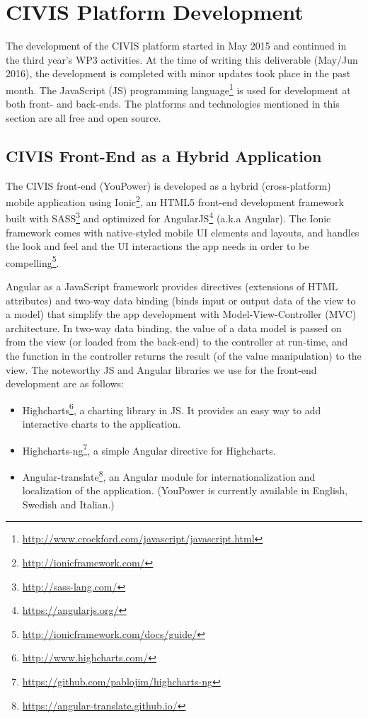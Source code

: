 \section{CIVIS Platform  Development} 
 
The development of the CIVIS platform started in May 2015 \citep{Huang2015c} and continued in the third year's WP3 activities. At the time of writing this deliverable (May/Jun 2016), the development is completed with minor updates took place in the past month.
% 
The JavaScript (JS) programming language\footnote{\url{http://www.crockford.com/javascript/javascript.html}} is used for development at both front- and back-ends. 
The platforms and technologies mentioned in this section are all free and open source. 

\subsection{CIVIS Front-End as a Hybrid Application} 

The CIVIS front-end (YouPower) is developed as a hybrid (cross-platform) mobile application using Ionic\footnote{\url{http://ionicframework.com/}}, an HTML5 front-end development framework built with SASS\footnote{\url{http://sass-lang.com/}} and optimized for AngularJS\footnote{\url{https://angularjs.org/}} (a.k.a Angular). 
% 
The Ionic framework comes with native-styled mobile UI elements and layouts, and handles the look and feel and the UI interactions the app needs in order to be compelling\footnote{\url{http://ionicframework.com/docs/guide/}}. 



Angular as a JavaScript framework provides directives (extensions of HTML attributes) and two-way data binding (binds input or output data of the view to a model) that simplify the app development with Model-View-Controller (MVC) architecture. 
In two-way data binding, the value of a data model is passed on from the view (or loaded from the back-end) to the controller at run-time, and the function in the controller returns the result (of the value manipulation) to the view. 
% 
The noteworthy JS and Angular libraries we use for the front-end development are as follows:
\begin{itemize}
\item
 Highcharts\footnote{\url{http://www.highcharts.com/}}, a charting library in JS. It provides an easy way to add interactive charts to the application. 
\item Highcharts-ng\footnote{\url{https://github.com/pablojim/highcharts-ng}}, a simple Angular directive for Highcharts. 
\item Angular-translate\footnote{\url{https://angular-translate.github.io/}}, an Angular module for internationalization and localization of the application. (YouPower is currently available in English, Swedish and Italian.)

\end{itemize}



